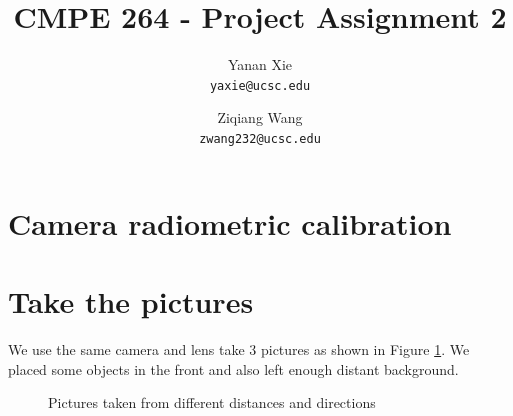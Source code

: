 \documentclass[10pt,twocolumn,letterpaper]{article}
\begin{document}
\title{CMPE 264 - Project Assignment 2}

\author{Yanan Xie\\
{\tt\small yaxie@ucsc.edu}
\and
Ziqiang Wang\\
{\tt\small zwang232@ucsc.edu}
}

\maketitle


\section{Camera radiometric calibration}

\section{Take the pictures}

We use the same camera and lens take 3 pictures as shown in Figure \ref{fig:pictures}. We placed some objects in the front and also left enough distant background.
\begin{figure}[t]
\centering
{}

\caption{Pictures taken from different distances and directions}
\label{fig:pictures}
\end{figure}
\end{document}
